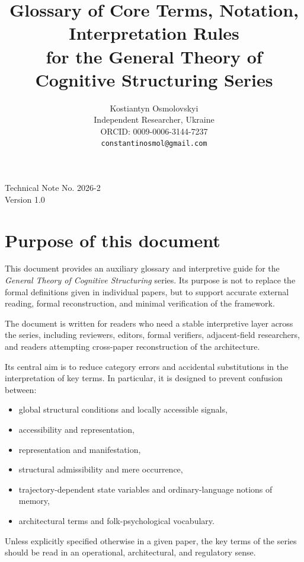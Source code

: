 \documentclass[11pt,a4paper]{article}
\title{Glossary of Core Terms, Notation, Interpretation Rules\\
	for the General Theory of Cognitive Structuring Series}
\author{
	Kostiantyn Osmolovskyi\\
	\small Independent Researcher, Ukraine\\
	\small ORCID: 0009-0006-3144-7237\\
	\small \texttt{constantinosmol@gmail.com}
}
\date{}
\begin{document}
	\maketitle

\begin{center}
	\small
	Technical Note No. 2026-2\\
	Version 1.0
\end{center}

\vspace{0.5em}
	
	\maketitle
	
	\section{Purpose of this document}
	
	This document provides an auxiliary glossary and interpretive guide for the \textit{General Theory of Cognitive Structuring} series. Its purpose is not to replace the formal definitions given in individual papers, but to support accurate external reading, formal reconstruction, and minimal verification of the framework.
	
	The document is written for readers who need a stable interpretive layer across the series, including reviewers, editors, formal verifiers, adjacent-field researchers, and readers attempting cross-paper reconstruction of the architecture.
	
	Its central aim is to reduce category errors and accidental substitutions in the interpretation of key terms. In particular, it is designed to prevent confusion between:
	\begin{itemize}[leftmargin=2em]
		\item global structural conditions and locally accessible signals,
		\item accessibility and representation,
		\item representation and manifestation,
		\item structural admissibility and mere occurrence,
		\item trajectory-dependent state variables and ordinary-language notions of memory,
		\item architectural terms and folk-psychological vocabulary.
	\end{itemize}
	
	Unless explicitly specified otherwise in a given paper, the key terms of the series should be read in an operational, architectural, and regulatory sense.
	
\end{document}
